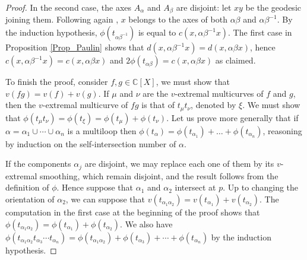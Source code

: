 \documentclass{amsart}
\newcommand{\C}{\mathbb{C}}
\begin{document}
\begin{proof}
In the second case, the axes $A_\alpha$ and $A_\beta$ are disjoint: let $xy$ be the geodesic joining them. Following again \cite{Paulin_Gromov-R-trees_1989}, $x$ belongs to the axes of both $\alpha\beta$ and $\alpha\beta^{-1}$. By the induction hypothesis, $\phi(t_{\alpha\beta^{-1}})$ is equal to $c(x,\alpha\beta^{-1}x)$. 
%
The first case in Proposition \ref{Prop_Paulin} shows that $d(x,\alpha\beta^{-1}x)=d(x,\alpha\beta x)$, hence $c(x,\alpha\beta^{-1}x)=c(x,\alpha\beta x)$ and $2\phi(t_{\alpha\beta})=c(x,\alpha\beta x)$ as claimed. 

To finish the proof, consider $f,g\in \C[X]$, we must show that $v(fg)=v(f)+v(g)$. If $\mu$ and $\nu$ are the $v$-extremal multicurves of $f$ and $g$, then the $v$-extremal multicurve of $fg$ is that of $t_\mu t_\nu$, denoted by $\xi$. We must show that $\phi(t_\mu t_\nu)=\phi(t_\xi)=\phi(t_\mu)+\phi(t_\nu)$.
%
Let us prove more generally that if $\alpha=\alpha_1\cup\cdots\cup\alpha_n$ is a multiloop then $\phi(t_\alpha)=\phi(t_{\alpha_1})+\dots+\phi(t_{\alpha_n})$, reasoning by induction on the self-intersection number of $\alpha$. 

If the components $\alpha_j$ are disjoint, we may replace each one of them by its $v$-extremal smoothing, which remain disjoint, and the result follows from the definition of $\phi$. 
%
Hence suppose that $\alpha_1$ and $\alpha_2$ intersect at $p$. Up to changing the orientation of $\alpha_2$, we can suppose that $v(t_{\alpha_1\alpha_2})=v(t_{\alpha_1})+v(t_{\alpha_2})$. The computation in the first case at the beginning of the proof shows that $\phi(t_{\alpha_1\alpha_2})=\phi(t_{\alpha_1})+\phi(t_{\alpha_2})$. We also have $\phi(t_{\alpha_1\alpha_2}t_{\alpha_3}\cdots t_{\alpha_n})=\phi(t_{\alpha_1\alpha_2})+\phi(t_{\alpha_3})+\cdots+\phi(t_{\alpha_n})$ by the induction hypothesis.
\end{proof}
\end{document}
